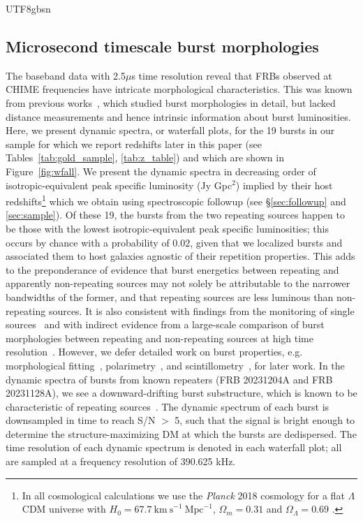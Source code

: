 \documentclass[twocolumn,linenumbers]{aastex631}
\begin{document}
\begin{CJK*}{UTF8}{gbsn}
\subsection{Microsecond timescale burst morphologies}
The baseband data with 2.5$\mu$s time resolution reveal that FRBs observed at CHIME frequencies have intricate morphological characteristics. This was known from previous works~\citep{pleunis2021fast,sand2024morphology137fastradio}, which studied burst morphologies in detail, but lacked distance measurements and hence intrinsic information about burst luminosities. Here, we present dynamic spectra, or waterfall plots, for the 19 bursts in our sample for which we report redshifts later in this paper (see Tables~\ref{tab:gold_sample}, \ref{tab:z_table}) and which are shown in Figure~\ref{fig:wfall}. We present the dynamic spectra in decreasing order of isotropic-equivalent peak specific luminosity (Jy Gpc$^2$) implied by their host redshifts\footnote{In all cosmological calculations we use the \textit{Planck} 2018 cosmology for a flat $\Lambda$CDM universe with $H_0 = 67.7~\mathrm{km~s}^{-1}~\mathrm{Mpc}^{-1}$, $\Omega_m=0.31$ and $\Omega_\Lambda = 0.69$ \citep{collaboration2020planck}.} which we obtain using spectroscopic followup (see \S\ref{sec:followup} and \ref{sec:sample}). Of these 19, the bursts from the two repeating sources happen to be those with the lowest isotropic-equivalent peak specific luminosities; this occurs by chance with a probability of $0.02$, given that we localized bursts and associated them to host galaxies agnostic of their repetition properties. This adds to the preponderance of evidence that burst energetics between repeating and apparently non-repeating sources may not solely be attributable to the narrower bandwidths of the former, and that repeating sources are less luminous than non-repeating sources. It is also consistent with findings from the monitoring of single sources~\citep{kirsten2024link,ould2024probe,pelliciari2024northern} and with indirect evidence from a large-scale comparison of burst morphologies between repeating and non-repeating sources at high time resolution~\citep{curtin2024morphology}. However, we defer detailed work on burst properties, e.g. morphological fitting~\citep{fonseca2024modeling,sand2024morphology137fastradio},  polarimetry~\citep{mckinven2021polarization}, and scintillometry~\citep{schoen2021scintillation,2024arXiv240611053N}, for later work. In the dynamic spectra of bursts from known repeaters (FRB 20231204A and FRB 20231128A), we see a downward-drifting burst substructure, which is known to be characteristic of repeating sources~\citep{pleunis2021fast}. The dynamic spectrum of each burst is downsampled in time to reach S/N $>$ 5, such that the signal is bright enough to determine the structure-maximizing DM \citep{HesselsstructmaxDM} at which the bursts are dedispersed. The time resolution of each dynamic spectrum is denoted in each waterfall plot; all are sampled at a frequency resolution of 390.625 kHz. %


\end{CJK*}
\end{document}
